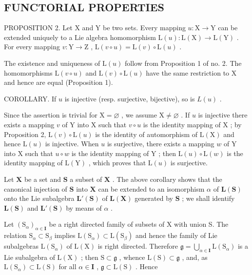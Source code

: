 \subsection{FUNCTORIAL PROPERTIES}

PROPOSITION 2. Let X and Y be two sets. Every mapping \(u: \mathrm{X} \to \mathrm{Y}\) can be extended uniquely to a Lie algebra homomorphism \(\mathrm{L}(u): \mathrm{L}(\mathrm{X}) \to \mathrm{L}(\mathrm{Y})\) . For every mapping \(v: \mathrm{Y} \to \mathrm{Z}\) , \(\mathrm{L}(v \circ u) = \mathrm{L}(v) \circ \mathrm{L}(u)\) .

The existence and uniqueness of \(\mathrm{L}(u)\) follow from Proposition 1 of no. 2. The homomorphisms \(\mathrm{L}(v\circ u)\) and \(\mathrm{L}(v)\circ \mathrm{L}(u)\) have the same restriction to X and hence are equal (Proposition 1).

COROLLARY. If \(u\) is injective (resp. surjective, bijective), so is \(L(u)\) .

Since the assertion is trivial for \(\mathrm{X} = \varnothing\) , we assume \(\mathrm{X} \neq \varnothing\) . If \(u\) is injective there exists a mapping \(v\) of \(\mathrm{Y}\) into \(\mathrm{X}\) such that \(v \circ u\) is the identity mapping of \(\mathrm{X}\) ; by Proposition 2, \(\mathrm{L}(v) \circ \mathrm{L}(u)\) is the identity of automorphism of \(\mathrm{L}(\mathrm{X})\) and hence \(\mathrm{L}(u)\) is injective. When \(u\) is surjective, there exists a mapping \(w\) of \(\mathrm{Y}\) into \(\mathrm{X}\) such that \(u \circ w\) is the identity mapping of \(\mathrm{Y}\) ; then \(\mathrm{L}(u) \circ \mathrm{L}(w)\) is the identity mapping of \(\mathrm{L}(\mathrm{Y})\) , which proves that \(\mathrm{L}(u)\) is surjective.

Let \(\mathbf{X}\) be a set and \(\mathbf{S}\) a subset of \(\mathbf{X}\) . The above corollary shows that the canonical injection of \(\mathbf{S}\) into \(\mathbf{X}\) can be extended to an isomorphism \(\alpha\) of \(\mathbf{L}(\mathbf{S})\) onto the Lie subalgebra \(\mathbf{L}'(\mathbf{S})\) of \(\mathbf{L}(\mathbf{X})\) generated by \(\mathbf{S}\) ; we shall identify \(\mathbf{L}(\mathbf{S})\) and \(\mathbf{L}'(\mathbf{S})\) by means of \(\alpha\) .

Let \((\mathrm{S}_{\alpha})_{\alpha \in \mathbf{I}}\) be a right directed family of subsets of X with union S. The relation \(\mathrm{S}_{\alpha} \subset \mathrm{S}_{\beta}\) implies \(\mathrm{L}(\mathrm{S}_{\alpha}) \subset \mathrm{L}(\mathrm{S}_{\beta})\) and hence the family of Lie subalgebras \(\mathrm{L}(\mathrm{S}_{\alpha})\) of \(\mathrm{L}(\mathrm{X})\) is right directed. Therefore \(\mathfrak{g} = \bigcup_{\alpha \in \mathbf{I}} \mathrm{L}(\mathrm{S}_{\alpha})\) is a Lie subalgebra of \(\mathrm{L}(\mathrm{X})\) ; then \(\mathrm{S} \subset \mathfrak{g}\) , whence \(\mathrm{L}(\mathrm{S}) \subset \mathfrak{g}\) , and, as \(\mathrm{L}(\mathrm{S}_{\alpha}) \subset \mathrm{L}(\mathrm{S})\) for all \(\alpha \in \mathbf{I}\) , \(\mathfrak{g} \subset \mathrm{L}(\mathrm{S})\) . Hence


